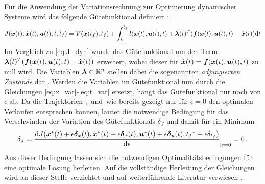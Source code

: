 Für die Anwendung der Variationsrechnung zur Optimierung dynamischer Systeme wird das folgende Gütefunktional definiert \cite{KnutGraichen.2012}:
\begin{equation}
J(\boldsymbol{x}(t),\dot{\boldsymbol{x}}(t),\boldsymbol{u}(t),t,t_f) = V(\boldsymbol{x}(t_f),t_f) + \int_{t_0}^{t_f}l(\boldsymbol{x}(t),\boldsymbol{u}(t),t) + \boldsymbol{\lambda}(t)^T(\boldsymbol{f}(\boldsymbol{x}(t),\boldsymbol{u}(t),t) - \dot{\boldsymbol{x}}(t))\textrm{d}{t} \label{eq:J_var_sys}
\end{equation}
Im Vergleich zu \eqref{eq:J_dyn} wurde das Gütefunktional um den Term $\boldsymbol{\lambda}(t)^T(\boldsymbol{f}(\boldsymbol{x}(t),\boldsymbol{u}(t),t) - \dot{\boldsymbol{x}}(t))$ erweitert, wobei dieser für $\dot{\boldsymbol{x}}(t) = \boldsymbol{f}(\boldsymbol{x}(t),\boldsymbol{u}(t),t)$ zu null wird. Die Variablen $\boldsymbol{\lambda}\in\mathbb{R}^n$ stellen dabei die sogenannten \textit{adjungierten Zustände} dar \cite{KnutGraichen.2012}. Werden die Variablen im Gütefunktional nun durch die Gleichungen \eqref{eq:x_var}-\eqref{eq:t_var} ersetzt, hängt das Gütefunktional nur noch von $\epsilon$ ab. Da die Trajektorien \xoft, \dxoft\,und \uoft\,wie bereits gezeigt nur für $\epsilon=0$ den optimalen Verläufen entsprechen können, lautet die notwendige Bedingung für das Verschwinden der Variation des Gütefunktionals $\delta_J$ und damit für ein Minimum 
\begin{equation}
	\delta_J = \frac{\textrm{d}J({\boldsymbol{x}}^*(t)+\epsilon\boldsymbol{\delta}_{x}(t),\dot{\boldsymbol{x}}^*(t) + \epsilon\boldsymbol{\delta}_{\dot{x}}(t),{\boldsymbol{u}}^*(t) + \epsilon\boldsymbol{\delta}_{u}(t),{t_f}^* + \epsilon\delta_{t_f})}{\textrm{d}{\epsilon}}_{|\epsilon=0}=0\,. \label{eq:VariationJ}
\end{equation}
Aus dieser Bedingung lassen sich die notwendigen Optimalitätsbedingungen für eine optimale Lösung herleiten. Auf die vollständige Herleitung der Gleichungen wird an dieser Stelle verzichtet und auf weiterführende Literatur verwiesen \cite{KnutGraichen.2012,Papageorgiou.2012,Gerdts.2010}.
